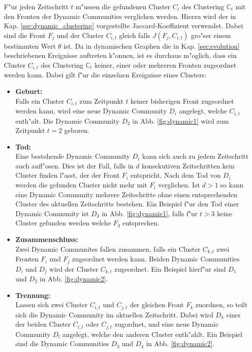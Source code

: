 \documentclass[journal]{vgtc}
\begin{document}
    F"ur jeden Zeitschritt $t$ m"ussen die gefundenen Cluster $C_i$ des Clustering $\mathbb{C}_t$ mit den Fronten der Dynamic Communities
    verglichen werden. Hierzu wird der in Kap. \ref{sec:dynamic_clustering} vorgestellte Jaccard-Koeffizient verwendet. Dabei sind die
    Front $F_j$ und der Cluster $C_{i,t}$ gleich falls $J(F_j,C_{i,t})$ gro"ser einem bestimmten Wert $\theta$ ist. Da in dynamischen Graphen
    die in Kap. \ref{sec:evolution} beschriebenen Ereignisse auftreten k"onnen, ist es durchaus m"oglich, dass ein Cluster $C_{i,t}$ des
    Clustering $\mathbb{C}_t$ keiner, einer oder mehreren Fronten zugeordnet werden kann. Dabei gilt f"ur die einzelnen Ereignisse eines Clusters:
    \begin{itemize}
      \item \textbf{Geburt:} \hfill \\
	    Falls ein Cluster $C_{i,t}$ zum Zeitpunkt $t$ keiner bisherigen Front zugeordnet werden kann, wird eine neue Dynamic Community
	    $D_i$ angelegt, welche $C_{i,t}$ enth"alt. Die Dynamic Community $D_2$ in Abb. \ref{fig:dynamic1} wird zum Zeitpunkt $t=2$ geboren. 
      \item \textbf{Tod:} \hfill \\
	    Eine bestehende Dynamic Community $D_i$ kann sich auch zu jedem Zeitschritt auch aufl"osen. Dies ist der Fall, falls in $d$ konsekutiven
	    Zeitschritten kein Cluster finden l"asst, der der Front $F_i$ entspricht. Nach dem Tod von $D_i$ werden die gefunden Cluster nicht mehr mit
	    $F_i$ verglichen. Ist $d>1$ so kann eine Dynamic Community mehrere Zeitschritte ohne einen entsprechenden Cluster des aktuellen Zeitschritts bestehen.
	    Ein Beispiel f"ur den Tod einer Dynamic Community ist $D_3$ in Abb. \ref{fig:dynamic1}, falls f"ur $t>3$ keine Cluster gefunden werden welche $F_3$ entsprechen.
      \item \textbf{Zusammenschluss:} \hfill \\
	    Zwei Dynamic Communites fallen zusammen, falls ein Cluster $C_{k,t}$ zwei Fronten $F_i$ und $F_j$ zugeordnet werden kann. Beiden Dynamic Communities
	    $D_i$ und $D_j$ wird der Cluster $C_{k,t}$ zugeordnet. Ein Beispiel hierf"ur sind $D_1$ und $D_2$ in Abb. \ref{fig:dynamic2}.
      \item \textbf{Trennung:} \hfill \\
	    Lassen sich zwei Cluster $C_{i,t}$ und $C_{j,t}$ der gleichen Front $F_k$ zuordnen, so teilt sich die Dynamic Community im aktuellen Zeitschritt.
	    Dabei wird $D_k$ einer der beiden Cluster $C_{i,t}$ oder $C_{j,t}$ zugordnet, und eine neue Dynamic Community $D_l$ angelegt, welche den anderen Cluster enth"ahlt.
	    Ein Beispiel sind die Dynamic Communities $D_3$ und $D_4$ in Abb. \ref{fig:dynamic2}.
    \end{itemize}
\end{document}
